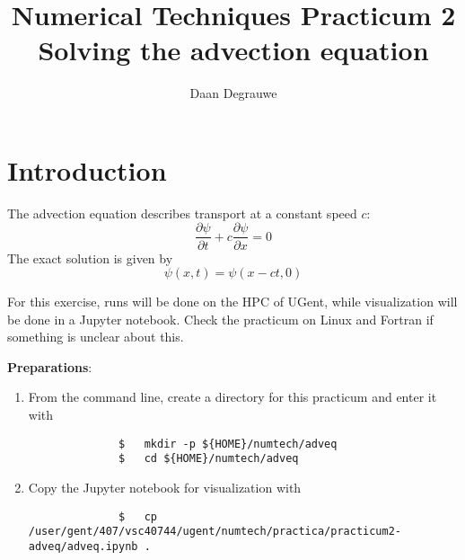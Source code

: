 \documentclass[a4paper]{article}
\title{%
	\bfseries%
	{\large Numerical Techniques Practicum 2}\\[3ex]
	{\Large Solving the advection equation}
}
\author{Daan Degrauwe}
\begin{document}
%
\maketitle
%
\section{Introduction}
%
\par
The advection equation describes transport at a constant speed $c$:
%
\begin{equation}
	\frac{\partial \psi}{\partial t}+c\frac{\partial \psi}{\partial x}=0
\end{equation}
%
The exact solution is given by
%
\begin{equation}
	\psi(x,t)=\psi(x-ct,0)
\end{equation}
%
\par
For this exercise, runs will be done on the HPC of UGent, while visualization will be done in a Jupyter notebook. Check the practicum on Linux and Fortran if something is unclear about this.
%
\par\vspace*{3ex}
\textbf{Preparations}:
%
\begin{enumerate}
	\item From the command line, create a directory for this practicum and enter it with
		\begin{verbatim}
			  $   mkdir -p ${HOME}/numtech/adveq
			  $   cd ${HOME}/numtech/adveq
		\end{verbatim}
	\item Copy the Jupyter notebook for visualization with
		\begin{verbatim}
			  $   cp /user/gent/407/vsc40744/ugent/numtech/practica/practicum2-adveq/adveq.ipynb .
		\end{verbatim}
\end{enumerate}
%
\end{document}
